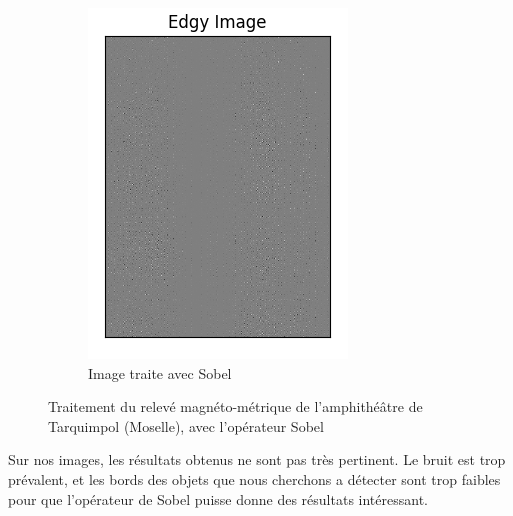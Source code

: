 \documentclass[a4paper, 12pt, titlepage, oneside, french]{article}
\begin{document}
\begin{figure}[H]
\begin{subfigure}[]{0.4\linewidth}
			\includegraphics[width=\linewidth]{Sobel1a.png}
			\caption{Image traite avec Sobel}
			
		\end{subfigure}
		\caption{Traitement du relevé magnéto-métrique de l'amphithéâtre de Tarquimpol (Moselle), avec l'opérateur Sobel}
		\label{fig:OurSobel}
	\end{figure}

	Sur nos images, les résultats obtenus ne sont pas très pertinent. Le bruit est trop prévalent, et les bords des objets que nous cherchons a détecter sont trop faibles pour que l'opérateur de Sobel puisse donne des résultats intéressant.
\end{document}
